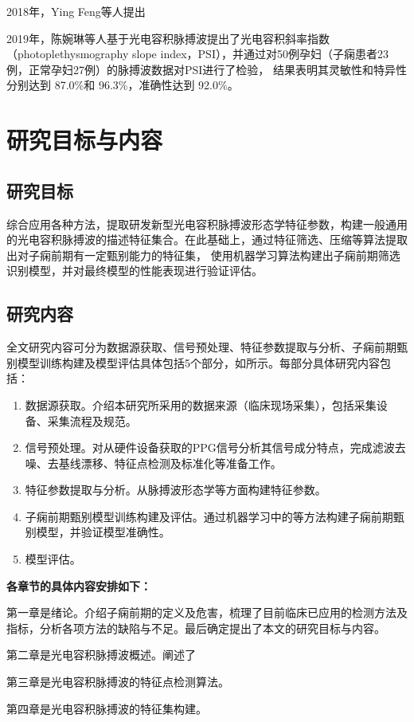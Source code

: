 2018年，Ying Feng等人提出

2019年，陈婉琳等人\cite{Chen2019}基于光电容积脉搏波提出了光电容积斜率指数（photoplethysmography slope index，PSI），并通过对50例孕妇（子痫患者23例，正常孕妇27例）的脉搏波数据对PSI进行了检验，
结果表明其灵敏性和特异性分别达到 87.0\%和 96.3\%，准确性达到 92.0\%。

\section{研究目标与内容}

\subsection{研究目标}
综合应用各种方法，提取研发新型光电容积脉搏波形态学特征参数，构建一般通用的光电容积脉搏波的描述特征集合。在此基础上，通过特征筛选、压缩等算法提取出对子痫前期有一定甄别能力的特征集，
使用机器学习算法构建出子痫前期筛选识别模型，并对最终模型的性能表现进行验证评估。
\subsection{研究内容}
全文研究内容可分为数据源获取、信号预处理、特征参数提取与分析、子痫前期甄别模型训练构建及模型评估具体包括5个部分，如所示。每部分具体研究内容包括：
\begin{enumerate}
    \item 数据源获取。介绍本研究所采用的数据来源（临床现场采集），包括采集设备、采集流程及规范。  
    \item 信号预处理。对从硬件设备获取的PPG信号分析其信号成分特点，完成滤波去噪、去基线漂移、特征点检测及标准化等准备工作。
    \item 特征参数提取与分析。从脉搏波形态学等方面构建特征参数。
    \item 子痫前期甄别模型训练构建及评估。通过机器学习中的等方法构建子痫前期甄别模型，并验证模型准确性。
    \item 模型评估。
\end{enumerate}

\textbf{各章节的具体内容安排如下：}

第一章是绪论。介绍子痫前期的定义及危害，梳理了目前临床已应用的检测方法及指标，分析各项方法的缺陷与不足。最后确定提出了本文的研究目标与内容。

第二章是光电容积脉搏波概述。阐述了

第三章是光电容积脉搏波的特征点检测算法。

第四章是光电容积脉搏波的特征集构建。

